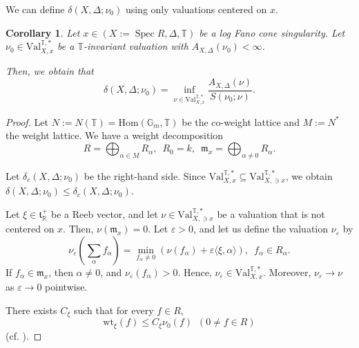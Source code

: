 \documentclass[a4paper,12pt]{amsart}
\newtheorem{corollary}[theorem]{Corollary}
\theoremstyle{definition} %
\theoremstyle{remark}
\numberwithin{equation}{section}
\newcommand{\R}{\mathbb{R}}
\def\Spec{\operatorname{Spec}}
\begin{document}
We can define $\delta(X,\Delta;\nu_0)$ using only valuations centered on $x$.

\begin{corollary} \label{sudosan}
Let $x\in (X:=\Spec R,\Delta,\mathbb{T})$ be a log Fano cone singularity. Let $\nu_0\in \mathrm{Val}^{\mathbb{T},*}_{X,x}$ be a $\mathbb{T}$-invariant valuation with $A_{X,\Delta}(\nu_0)<\infty$.

\smallskip

Then, we obtain that
$$ \delta(X,\Delta;\nu_0)=\inf_{\nu\in \mathrm{Val}^{\mathbb{T},*}_{X,x}}\frac{A_{X,\Delta}(\nu)}{S(\nu_0;\nu)}. $$
\end{corollary}

\begin{proof}
Let $N:=N(\mathbb{T})=\mathrm{Hom}(\mathbb{G}_m,\mathbb{T})$ be the co-weight lattice and $M:=N^*$ the weight lattice. We have a weight decomposition
$$ R=\bigoplus_{\alpha\in M}R_{\alpha}, \,\,\,R_0=k,\,\,\, \mathfrak{m}_x=\bigoplus_{\alpha \ne 0}R_{\alpha}.$$

\smallskip

Let $\delta_c(X,\Delta;\nu_0)$ be the right-hand side. Since $\mathrm{Val}^{\mathbb{T},*}_{X,x}\subseteq \mathrm{Val}^{\mathbb{T},*}_{X,\ni x}$, we obtain $\delta(X,\Delta;\nu_0)\le \delta_c(X,\Delta;\nu_0)$.

\smallskip

Let $\xi\in \mathfrak{t}^+_{\R}$ be a Reeb vector, and let $\nu\in \mathrm{Val}^{\mathbb{T},*}_{X,\ni x}$ be a valuation that is not centered on $x$. Then, $\nu(\mathfrak{m}_x)=0$. Let $\varepsilon>0$, and let us define the valuation $\nu_{\varepsilon}$ by
$$ \nu_{\varepsilon}\left(\sum_{\alpha}f_{\alpha}\right)=\min_{f_{\alpha}\ne 0}(\nu(f_{\alpha})+\varepsilon \langle \xi,\alpha\rangle),\,\,\,f_{\alpha}\in R_{\alpha}.$$
If $f_{\alpha}\in \mathfrak{m}_x$, then $\alpha\ne 0$, and $\nu_{\varepsilon}(f_{\alpha})>0$. Hence, $\nu_{\varepsilon}\in \mathrm{Val}^{\mathbb{T},*}_{X,x}$. Moreover, $\nu_{\varepsilon}\to \nu$ as $\varepsilon \to 0$ pointwise.

\smallskip

There exists $C_{\xi}$ such that for every $f\in R$,
\begin{equation} \label{용흥동}
\mathrm{wt}_{\xi}(f)\le C_{\xi}\nu_0(f)\,\,\,(0\ne f\in R)
\end{equation}
(cf. \cite[Proposition 2.2]{XZ20}).

\smallskip


\end{proof}
\end{document}
